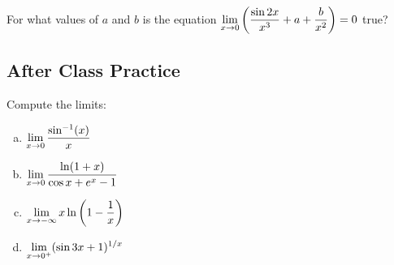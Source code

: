 \documentclass[notes]{subfiles}
\begin{document}
		\begin{ex}
			For what values of \(a\) and \(b\) is the equation \(\displaystyle \lim_{x\to 0} \left( \dfrac{\sin 2x}{x^3} + a + \dfrac{b}{x^2}\right) = 0\) true?
		\end{ex}
			\newpage
			
	\subsection*{After Class Practice}
		\begin{ex}
			Compute the limits:
			\begin{enumerate}[(a)]
				\item \(\displaystyle \lim_{x\to 0} \dfrac{\sin^{-1}(x)}{x}\)
					
				\item \(\displaystyle \lim_{x\to 0} \dfrac{\ln (1+x)}{\cos x + e^x - 1}\)
					
				\item \(\displaystyle \lim_{x\to -\infty} x\ln\left( 1 - \dfrac{1}{x}\right)\)
					
				\item \(\displaystyle \lim_{x\to 0^+} (\sin 3x + 1)^{1/x}\)
			\end{enumerate}
		\end{ex}
		
\clearpage
\end{document}
